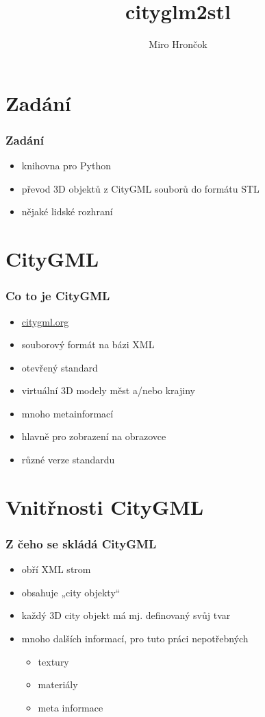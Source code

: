 \documentclass{beamer}
\title{cityglm2stl}
\author{Miro Hrončok}
\institute[IF2015]{FSv ČVUT}
\begin{document}
\begin{frame}
  \titlepage
\end{frame}

\section{Zadání}

\begin{frame}
  \frametitle{Zadání}
    \begin{itemize}[<+->]
      \item knihovna pro Python
      \item převod 3D objektů z CityGML souborů do formátu STL
      \item nějaké lidské rozhraní
    \end{itemize}
\end{frame}

\section{CityGML}

\begin{frame}
  \frametitle{Co to je CityGML}
    \begin{itemize}[<+->]
      \item \href{http://www.citygml.org/}{citygml.org}
      \item souborový formát na bázi XML
      \item otevřený standard
      \item virtuální 3D modely měst a/nebo krajiny
      \item mnoho metainformací
      \item hlavně pro zobrazení na obrazovce
      \item různé verze standardu
    \end{itemize}
\end{frame}

\section{Vnitřnosti CityGML}

\begin{frame}
  \frametitle{Z čeho se skládá CityGML}
    \begin{itemize}[<+->]
      \item obří XML strom
      \item obsahuje „city objekty“
      \item každý 3D city objekt má mj. definovaný svůj tvar
      \item mnoho dalších informací, pro tuto práci nepotřebných
      \begin{itemize}[<+->]
        \item textury
        \item materiály
        \item meta informace
      \end{itemize}
    \end{itemize}
\end{frame}
\end{document}
